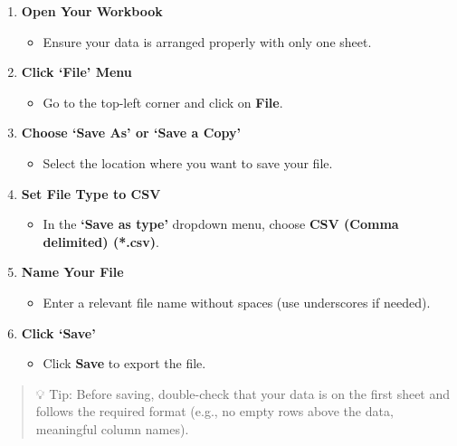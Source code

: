 \documentclass[
  letterpaper,
  DIV=11,
  numbers=noendperiod]{scrartcl}
\providecommand{\tightlist}{%
  \setlength{\itemsep}{0pt}\setlength{\parskip}{0pt}}\usepackage{longtable,booktabs,array}
\begin{document}
\begin{enumerate}
\def\labelenumi{\arabic{enumi}.}
\item
  \textbf{Open Your Workbook}

  \begin{itemize}
  \tightlist
  \item
    Ensure your data is arranged properly with only one sheet.
  \end{itemize}
\item
  \textbf{Click `File' Menu}

  \begin{itemize}
  \tightlist
  \item
    Go to the top-left corner and click on \textbf{File}.
  \end{itemize}
\item
  \textbf{Choose `Save As' or `Save a Copy'}

  \begin{itemize}
  \tightlist
  \item
    Select the location where you want to save your file.
  \end{itemize}
\item
  \textbf{Set File Type to CSV}

  \begin{itemize}
  \tightlist
  \item
    In the \textbf{`Save as type'} dropdown menu, choose \textbf{CSV
    (Comma delimited) (*.csv)}.
  \end{itemize}
\item
  \textbf{Name Your File}

  \begin{itemize}
  \tightlist
  \item
    Enter a relevant file name without spaces (use underscores if
    needed).
  \end{itemize}
\item
  \textbf{Click `Save'}

  \begin{itemize}
  \tightlist
  \item
    Click \textbf{Save} to export the file.
  \end{itemize}
\end{enumerate}

\begin{quote}
💡 Tip: Before saving, double-check that your data is on the first sheet
and follows the required format (e.g., no empty rows above the data,
meaningful column names).
\end{quote}
\end{document}
